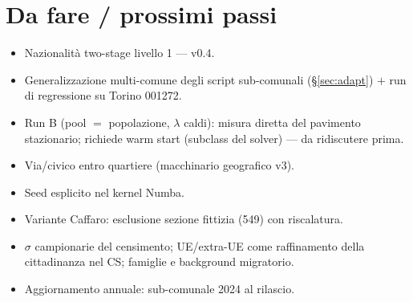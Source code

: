 \documentclass[11pt,a4paper]{article}
\begin{document}
\section{Da fare / prossimi passi}
\begin{itemize}[leftmargin=*,itemsep=1pt]
  \item[$\boxtimes$] Nazionalit\`a two-stage livello 1 --- v0.4.
  \item[$\square$] Generalizzazione multi-comune degli script sub-comunali
  (\S\ref{sec:adapt}) $+$ run di regressione su Torino 001272.
  \item[$\square$] Run B (pool $=$ popolazione, $\lambda$ caldi): misura
  diretta del pavimento stazionario; richiede warm start (subclass del
  solver) --- da ridiscutere prima.
  \item[$\square$] Via/civico entro quartiere (macchinario geografico v3).
  \item[$\square$] Seed esplicito nel kernel Numba.
  \item[$\square$] Variante Caffaro: esclusione sezione fittizia (549) con
  riscalatura.
  \item[$\square$] $\sigma$ campionarie del censimento; UE/extra-UE come
  raffinamento della cittadinanza nel CS; famiglie e background migratorio.
  \item[$\square$] Aggiornamento annuale: sub-comunale 2024 al rilascio.
\end{itemize}
\end{document}

